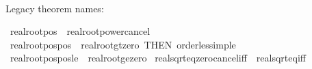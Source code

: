 \begin{isabellebody}
\ \ \isamarkupfalse%
\isanewline
{}\isamarkupfalse%
%
\endisatagproof
{\isafoldproof}%
%
\isadelimproof
%
\endisadelimproof
%
\begin{isamarkuptext}%
Legacy theorem names:%
\end{isamarkuptext}\isamarkuptrue%
\isamarkupfalse%
\ real{\isacharunderscore}{\kern0pt}root{\isacharunderscore}{\kern0pt}pos{}\ {\isacharequal}{\kern0pt}\ real{\isacharunderscore}{\kern0pt}root{\isacharunderscore}{\kern0pt}power{\isacharunderscore}{\kern0pt}cancel\isanewline
{}\isamarkupfalse%
\ real{\isacharunderscore}{\kern0pt}root{\isacharunderscore}{\kern0pt}pos{\isacharunderscore}{\kern0pt}pos\ {\isacharequal}{\kern0pt}\ real{\isacharunderscore}{\kern0pt}root{\isacharunderscore}{\kern0pt}gt{\isacharunderscore}{\kern0pt}zero\ {\isacharbrackleft}{\kern0pt}THEN\ order{\isacharunderscore}{\kern0pt}less{\isacharunderscore}{\kern0pt}imp{\isacharunderscore}{\kern0pt}le{\isacharbrackright}{\kern0pt}\isanewline
{}\isamarkupfalse%
\ real{\isacharunderscore}{\kern0pt}root{\isacharunderscore}{\kern0pt}pos{\isacharunderscore}{\kern0pt}pos{\isacharunderscore}{\kern0pt}le\ {\isacharequal}{\kern0pt}\ real{\isacharunderscore}{\kern0pt}root{\isacharunderscore}{\kern0pt}ge{\isacharunderscore}{\kern0pt}zero\isanewline
{}\isamarkupfalse%
\ real{\isacharunderscore}{\kern0pt}sqrt{\isacharunderscore}{\kern0pt}eq{\isacharunderscore}{\kern0pt}zero{\isacharunderscore}{\kern0pt}cancel{\isacharunderscore}{\kern0pt}iff\ {\isacharequal}{\kern0pt}\ real{\isacharunderscore}{\kern0pt}sqrt{\isacharunderscore}{\kern0pt}eq{\isacharunderscore}{\kern0pt}{}{\isacharunderscore}{\kern0pt}iff\isanewline
%
\isadelimtheory
\isanewline
%
\endisadelimtheory
%
\isatagtheory
{}\isamarkupfalse%
%
\endisatagtheory
{\isafoldtheory}%
%
\isadelimtheory
%
\endisadelimtheory
%
\end{isabellebody}%
\endinput
